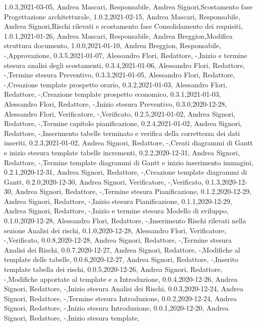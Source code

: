 {    {1.0.3,2021-03-05, Andrea Mascari, Responsabile, Andrea Signori,Scostamento fase Progettazione architetturale},
    {1.0.2,2021-02-15, Andrea Mascari, Responsabile, Andrea Signori,Rischi rilevati e scostamento fase Consolidamento dei requisiti},
    {1.0.1,2021-01-26, Andrea Mascari, Responsabile, Andrea Breggion,Modifica struttura documento},
    {1.0.0,2021-01-10, Andrea Breggion, Responsabile, -,Approvazione},
    {0.3.5,2021-01-07, Alessandro Flori, Redattore, -,Inizio e termine stesura analisi degli scostamenti},
    {0.3.4,2021-01-06, Alessandro Flori, Redattore, -,Termine stesura Preventivo},
    {0.3.3,2021-01-05, Alessandro Flori, Redattore, -,Creazione template prospetto orario},
    {0.3.2,2021-01-03, Alessandro Flori, Redattore, -,Creazione template prospetto economico},
    {0.3.1,2021-01-03, Alessandro Flori, Redattore, -,Inizio stesura Preventivo},
    {0.3.0,2020-12-28, Alessandro Flori, Verificatore, -,Verificato},
    {0.2.5,2021-01-02, Andrea Signori, Redattore, -,Termine capitolo pianificazione},
    {0.2.4,2021-01-02, Andrea Signori, Redattore, -,Inserimento tabelle terminato e verifica della correttezza dei dati inseriti},
    {0.2.3,2021-01-02, Andrea Signori, Redattore, -,Creati diagrammi di Gantt e inizio stesura template tabelle incrementi},
    {0.2.2,2020-12-31, Andrea Signori, Redattore, -,Termine template diagrammi di Gantt e inizio inserimento immagini},
    {0.2.1,2020-12-31, Andrea Signori, Redattore, -,Creazione template diagrammi di Gantt},
    {0.2.0,2020-12-30, Andrea Signori, Verificatore, -,Verificato},
    {0.1.3,2020-12-30, Andrea Signori, Redattore, -,Termine stesura Pianificazione},
    {0.1.2,2020-12-29, Andrea Signori, Redattore, -,Inizio stesura Pianificazione},
    {0.1.1,2020-12-29, Andrea Signori, Redattore, -,Inizio e termine stesura Modello di sviluppo},
    {0.1.0,2020-12-28, Alessandro Flori, Redattore, -,Inserimento Rischi rilevati nella sezione Analisi dei rischi},
    {0.1.0,2020-12-28, Alessandro Flori, Verificatore, -,Verificato},
    {0.0.8,2020-12-28, Andrea Signori, Redattore, -,Termine stesura Analisi dei Rischi},
    {0.0.7,2020-12-27, Andrea Signori, Redattore, -,Modifiche al template delle tabelle},
    {0.0.6,2020-12-27, Andrea Signori, Redattore, -,Inserito template tabella dei rischi},
    {0.0.5,2020-12-26, Andrea Signori, Redattore, -,Modifiche apportate al template e a Introduzione},
    {0.0.4,2020-12-26, Andrea Signori, Redattore, -,Inizio stesura Analisi dei Rischi},
    {0.0.3,2020-12-24, Andrea Signori, Redattore, -,Termine stesura Introduzione},
    {0.0.2,2020-12-24, Andrea Signori, Redattore, -,Inizio stesura Introduzione},
    {0.0.1,2020-12-20, Andrea Signori, Redattore, -,Inizio stesura template},
}
